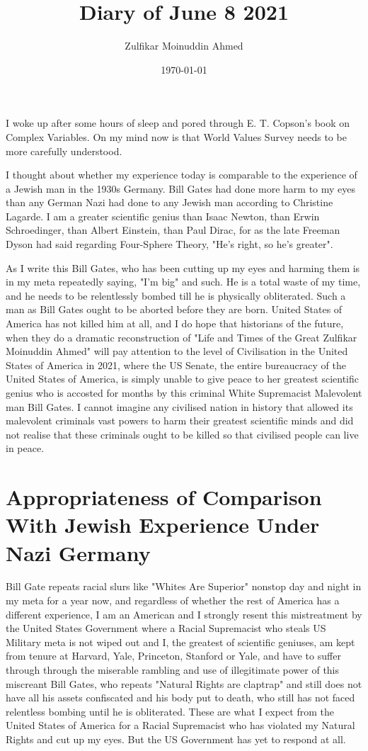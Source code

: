 \documentclass{amsart}
\title{Diary of June 8 2021}
\author{Zulfikar Moinuddin Ahmed}
\date{\today}
\begin{document}
\maketitle

I woke up after some hours of sleep and pored through E. T. Copson's book on Complex Variables.  On my mind now is that World Values Survey needs to be more carefully understood.  

I thought about whether my experience today is comparable to the experience of a Jewish man in the 1930s Germany.   Bill Gates had done more harm to my eyes than any German Nazi had done to any Jewish man according to Christine Lagarde.  I am a greater scientific genius than Isaac Newton, than Erwin Schroedinger, than Albert Einstein, than Paul Dirac, for as the late Freeman Dyson had said regarding Four-Sphere Theory, "He's right, so he's greater".  

As I write this Bill Gates, who has been cutting up my eyes and harming them is in my meta repeatedly saying, "I'm big" and such.  He is a total waste of my time, and he needs to be relentlessly bombed till he is physically obliterated.  Such a man as Bill Gates ought to be aborted before they are born.  United States of America has not killed him at all, and I do hope that historians of the future, when they do a dramatic reconstruction of "Life and Times of the Great Zulfikar Moinuddin Ahmed" will pay attention to the level of Civilisation in the United States of America in 2021, where the US Senate, the entire bureaucracy of the United States of America, is simply unable to give peace to her greatest scientific genius who is accosted for months by this criminal White Supremacist Malevolent man Bill Gates.  I cannot imagine any civilised nation in history that allowed its malevolent criminals vast powers to harm their greatest scientific minds and did not realise that these criminals ought to be killed so that civilised people can live in peace.  

\section{Appropriateness of Comparison With Jewish Experience Under Nazi Germany}

Bill Gate repeats racial slurs like "Whites Are Superior" nonstop day and night in my meta for a year now, and regardless of whether the rest of America has a different experience, I am an American and I strongly resent this mistreatment by the United States Government where a Racial Supremacist who steals US Military meta is not wiped out and I, the greatest of scientific geniuses, am kept from tenure at Harvard, Yale, Princeton, Stanford or Yale, and have to suffer through through the miserable rambling and use of illegitimate power of this miscreant Bill Gates, who repeats "Natural Rights are claptrap" and still does not have all his assets confiscated and his body put to death, who still has not faced relentless bombing until he is obliterated.  These are what I expect from the United States of America for a Racial Supremacist who has violated my Natural Rights and cut up my eyes.  But the US Government has yet to respond at all.
\end{document}
